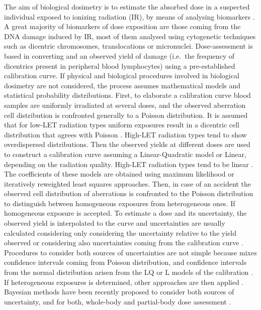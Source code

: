 \documentclass[]{scrartcl}
\begin{document}
The aim of biological dosimetry is to estimate the absorbed dose in a suspected individual exposed to ionizing radiation (IR), by means of analysing biomarkers \citep{IAEA2011}. A great majority of biomarkers of dose exposition are those coming from the DNA damage induced by IR, most of them analysed using cytogenetic techniques such as dicentric chromosomes, translocations or micronuclei. Dose-assessment is based in converting and an observed yield of damage (i.e.~the frequency of dicentrics present in peripheral blood lymphocytes) using a pre-established calibration curve. If physical and biological procedures involved in biological dosimetry are not considered, the process assumes mathematical models and statistical probability distributions. First, to elaborate a calibration curve blood samples are uniformly irradiated at several doses, and the observed aberration cell distribution is confronted generally to a Poisson distribution. It is assumed that for low-LET radiation types uniform exposures result in a dicentric cell distribution that agrees with Poisson \citep{Edwards1979}. High-LET radiation types tend to show overdispersed distributions. Then the observed yields at different doses are used to construct a calibration curve assuming a Linear-Quadratic model or Linear, depending on the radiation quality. High-LET radiation types tend to be linear \citep{Edwards1980}. The coefficients of these models are obtained using maximum likelihood or iteratively reweighted least squares approaches. Then, in case of an accident the observed cell distribution of aberrations is confronted to the Poisson distribution to distinguish between homogeneous exposures from heterogeneous ones. If homogeneous exposure is accepted. To estimate a dose and its uncertainty, the observed yield is interpolated to the curve and uncertainties are usually calculated considering only considering the uncertainty relative to the yield observed or considering also uncertainties coming from the calibration curve \citep{Edwards1978, Merkle1983, Savage2000}. Procedures to consider both sources of uncertainties are not simple because mixes confidence intervals coming from Poisson distribution, and confidence intervals from the normal distribution arisen from the LQ or L models of the calibration \citep{Merkle1983, Savage2000}. If heterogeneous exposures is determined, other approaches are then applied \citep{Dolphin1969, Sasaki1968, Pujol2016}. Bayesian methods have been recently proposed to consider both sources of uncertainty, and for both, whole-body and partial-body dose assessment \citep{Ainsbury2014, Morina2015, Higueras2015}.
\end{document}
